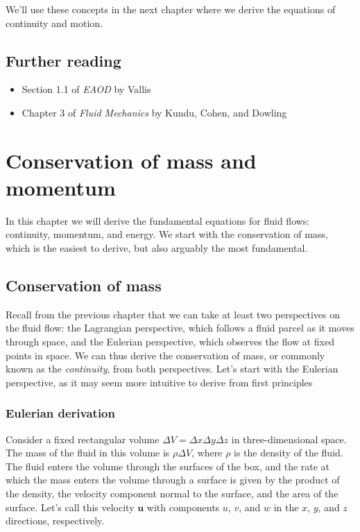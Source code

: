 \documentclass[12pt]{article}
\numberwithin{equation}{section}
\numberwithin{figure}{section}
\numberwithin{table}{section}
\begin{document}
We'll use these concepts in the next chapter where we derive the equations of
continuity and motion.

\subsection*{Further reading}

\begin{itemize}
  \item Section 1.1 of \textit{EAOD} by Vallis
  \item Chapter 3 of \textit{Fluid Mechanics} by Kundu, Cohen, and Dowling
\end{itemize}

\newpage
\section{Conservation of mass and momentum}
\label{sec:continuity_momentum}

In this chapter we will derive the fundamental equations for fluid flows:
continuity, momentum, and energy.
We start with the conservation of mass, which is the easiest to derive, but also
arguably the most fundamental.

\subsection{Conservation of mass}

Recall from the previous chapter that we can take at least two perspectives
on the fluid flow: the Lagrangian perspective, which follows a fluid parcel as it
moves through space, and the Eulerian perspective, which observes the flow at
fixed points in space.
We can thus derive the conservation of mass, or commonly known as the
\textit{continuity}, from both perspectives.
Let's start with the Eulerian perspective, as it may seem more intuitive to
derive from first principles

\subsubsection{Eulerian derivation}

Consider a fixed rectangular volume $\Delta V = \Delta x \Delta y \Delta z$ in
three-dimensional space.
The mass of the fluid in this volume is $\rho \Delta V$, where $\rho$ is the
density of the fluid.
The fluid enters the volume through the surfaces of the box, and the rate at
which the mass enters the volume through a surface is given by the product of
the density, the velocity component normal to the surface, and the area of the
surface.
Let's call this velocity $\mathbf{u}$ with components $u$, $v$, and $w$ in the
$x$, $y$, and $z$ directions, respectively.
\end{document}
